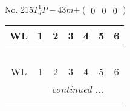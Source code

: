 \documentclass[fleqn,9pt,landscape]{jsarticle}
\begin{document}
\newpage
No. 215\quad$T_{d}^{1}$\quad$P-43m$\quad[ cubic ]\quad$+\begin{pmatrix} 0 & 0 & 0 \end{pmatrix}$
\begin{center}
\renewcommand{\arraystretch}{1.2}
\begin{longtable}{ccccccc}
 \hline \hline
WL & 1 & 2 & 3 & 4 & 5 & 6 \\ \hline \endfirsthead

\multicolumn{6}{l}{\tablename\ \thetable{}} \\
 \hline \hline
WL & 1 & 2 & 3 & 4 & 5 & 6 \\ \hline \endhead

 \hline \hline
\multicolumn{6}{r}{\footnotesize\it continued ...} \\ \endfoot

 \hline \hline
\multicolumn{6}{r}{} \\ \endlastfoot


\end{longtable}
\end{center}
\end{document}
